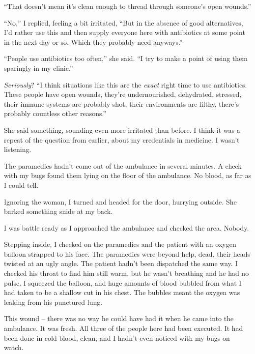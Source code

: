 ``That doesn't mean it's clean enough to thread through someone's open wounds.''



``No,'' I replied, feeling a bit irritated, ``But in the absence of good alternatives, I'd rather use this and then supply everyone here with antibiotics at some point in the next day or so.  Which they probably need anyways.''



``People use antibiotics too often,'' she said.  ``I try to make a point of using them sparingly in my clinic.''



\emph{Seriously}?  ``I think situations like this are the \emph{exact} right time to use antibiotics.  These people have open wounds, they're undernourished, dehydrated, stressed, their immune systems are probably shot, their environments are filthy, there's probably countless other reasons.''



She said something, sounding even more irritated than before.  I think it was a repeat of the question from earlier, about my credentials in medicine.  I wasn't listening.



The paramedics hadn't come out of the ambulance in several minutes.  A check with my bugs found them lying on the floor of the ambulance.  No blood, as far as I could tell.



Ignoring the woman, I turned and headed for the door, hurrying outside.  She barked something snide at my back.



I was battle ready as I approached the ambulance and checked the area.  Nobody.



Stepping inside, I checked on the paramedics and the patient with an oxygen balloon strapped to his face.  The paramedics were beyond help, dead, their heads twisted at an ugly angle.  The patient hadn't been dispatched the same way.  I checked his throat to find him still warm, but he wasn't breathing and he had no pulse.  I squeezed the balloon, and huge amounts of blood bubbled from what I had taken to be a shallow cut in his chest. The bubbles meant the oxygen was leaking from his punctured lung.



This wound – there was no way he could have had it when he came into the ambulance.  It was fresh.  All three of the people here had been executed.  It had been done in cold blood, clean, and I hadn't even noticed with my bugs on watch.



